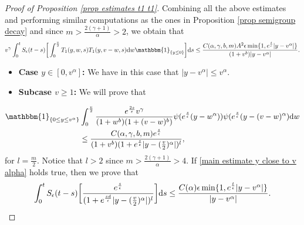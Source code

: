 \documentclass[11pt]{article}
\numberwithin{equation}{section}
\newcommand{\der}{\textup{d}}
\begin{document}
\begin{proof}[Proof of Proposition 
\ref{prop estimates t1 t1}]
Combining all the above estimates and performing similar computations as the ones in Proposition \ref{prop semigroup decay} and since $m>\frac{2(\gamma+1)}{\alpha}>2$, we obtain that
\begin{align}\label{e1}
  v^{\gamma}\int_{0}^{t}S_{\epsilon}(t-s)\bigg[ \int_{0}^{\frac{v}{2}} T_{1}(y,w,s)T_{1}(y,v-w,s)\der w  \mathbbm{1}_{\{y\leq 0\}}  \bigg]\der s\leq \frac{  C(\alpha,\gamma,b,m)A^{2}\epsilon\min\{1,e^{\frac{t}{\epsilon}}|y-v^{\alpha}|\}}{(1+v^{b})|y-v^{\alpha}|}.
\end{align}
\begin{itemize}
    \item \textbf{Case $y\in[0,v^{\alpha}]$:} We have in this case that $|y-v^{\alpha}|\leq v^{\alpha}$.
    \end{itemize}
    \begin{itemize}
    \item \textbf{Subcase $v\geq 1$:} We will prove that 
\end{itemize}
\begin{align}\label{main estimate y close to v alpha}
\mathbbm{1}_{\{0\leq y\leq v^{\alpha}\}}&\int_{0}^{\frac{v}{2}}\frac{e^{\frac{2s}{\epsilon}}v^{\gamma}}{(1+w^{b})(1+(v-w)^{b})}\psi(e^{\frac{s}{\epsilon}}(y-w^{\alpha}))\psi(e^{\frac{s}{\epsilon}}(y-(v-w)^{\alpha})\der w\nonumber\\
&\leq \frac{C(\alpha,\gamma,b,m) e^{\frac{s}{\epsilon}}}{(1+v^{b})(1+e^{\frac{s}{\epsilon}}|y-(\frac{v}{2})^{\alpha}|)^{l}},
  \end{align}
  for  $l=\frac{m}{2}$. Notice that $l>2$ since $m>\frac{2(\gamma+1)}{\alpha}>4.$ If \eqref{main estimate y close to v alpha} holds true, then we prove that
  \begin{align}\label{needed later for t2 t1}
      \int_{0}^{t}S_{\epsilon}(t  -s)\bigg[\frac{ e^{\frac{s}{\epsilon}}}{(1+e^{\frac{sd}{\epsilon}}|y-(\frac{v}{2})^{\alpha}|)^{l}}\bigg]\der s\leq\frac{ C(\alpha)\epsilon\min\{1,e^{\frac{t}{\epsilon}}|y-v^{\alpha}|\}}{|y-v^{\alpha}|}.
  \end{align}
  


\end{proof}
\end{document}
